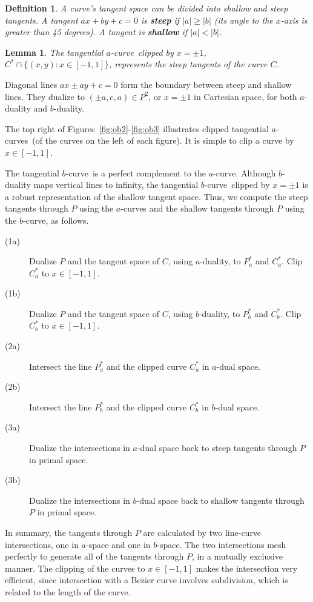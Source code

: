 \documentclass[twocolumn,10pt]{article}
\newcommand{\prf}{\noindent{{\bf Proof}:\ \ \ }}
\newcommand{\QED}{\vrule height 1.4ex width 1.0ex depth -.1ex\ \vspace{.2in}} %
\newcommand{\atang}{tangential $a$-curve\ }
\newcommand{\btang}{tangential $b$-curve\ }
\newcommand{\atangs}{tangential $a$-curves\ }
\newtheorem{lemma}[theorem]{Lemma}
\newtheorem{defn2}[theorem]{Definition}
\begin{document}
\begin{defn2}
A curve's tangent space can be divided into shallow and steep tangents.
A tangent $ax+by+c=0$ is {\bf steep} if $|a| \geq |b|$
(its angle to the $x$-axis is greater than 45 degrees).
A tangent is {\bf shallow} if $|a| < |b|$.
\end{defn2}

\begin{lemma}
The \atang clipped by $x = \pm 1$,
$C^* \cap \{(x,y) : x \in [-1,1] \}$,
represents the steep tangents of the curve $C$.
\end{lemma}
\prf
Diagonal lines $ax \pm ay+c=0$ form the boundary between steep and shallow lines.
They dualize to $(\pm a,c,a) \in P^2$, or $x=\pm 1$ in Cartesian space,
for both $a$-duality and $b$-duality.
\QED

The top right of Figures~\ref{fig:ob2}-\ref{fig:ob3} illustrates
clipped \atangs (of the curves on the left of each figure).
It is simple to clip a curve by $x \in [-1,1]$.

The \btang is a perfect complement to the $a$-curve.
Although $b$-duality maps vertical lines to infinity,
the \btang clipped by $x = \pm 1$ is a robust representation of the 
shallow tangent space.
Thus, we compute the steep tangents through $P$ using the $a$-curves
and the shallow tangents through $P$ using the $b$-curve, as follows.
%
\begin{description}
\item[(1a)]	Dualize $P$ and the tangent space of $C$, using $a$-duality,
		to $P_a^*$ and $C_a^*$.  Clip $C_a^*$ to $x \in [-1,1]$.
\item[(1b)]	Dualize $P$ and the tangent space of $C$, using $b$-duality,
		to $P_b^*$ and $C_b^*$.  Clip $C_b^*$ to $x \in [-1,1]$.
\item[(2a)]	Intersect the line $P_a^*$ and the clipped curve $C_a^*$ 
		in $a$-dual space.
\item[(2b)]	Intersect the line $P_b^*$ and the clipped curve 
		$C_b^*$ in $b$-dual space.
\item[(3a)]	Dualize the intersections in $a$-dual space 
		back to steep tangents through $P$ in primal space.
\item[(3b)]	Dualize the intersections in $b$-dual space 
		back to shallow tangents through $P$ in primal space.
\end{description}

In summary, the tangents through $P$ are calculated by two line-curve
intersections, one in $a$-space and one in $b$-space.
The two intersections mesh perfectly to generate all of the 
tangents through $P$, in a mutually exclusive manner.
The clipping of the curves to $x \in [-1,1]$ makes the intersection very efficient,
since intersection with a Bezier curve involves subdivision,
which is related to the length of the curve.
\end{document}

